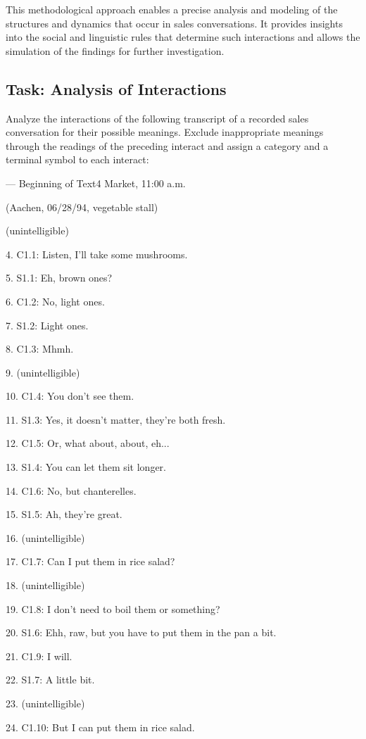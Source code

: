 \documentclass[
]{article}
\begin{document}
This methodological approach enables a precise analysis and modeling of the structures and dynamics that occur in sales conversations. It provides insights into the social and linguistic rules that determine such interactions and allows the simulation of the findings for further investigation.

\subsection{Task: Analysis of Interactions}\label{task-analysis-of-interactions}

Analyze the interactions of the following transcript of a recorded sales conversation for their possible meanings. Exclude inappropriate meanings through the readings of the preceding interact and assign a category and a terminal symbol to each interact:

--- Beginning of Text4 Market, 11:00 a.m.

(Aachen, 06/28/94, vegetable stall)

(unintelligible)

4. C1.1: Listen, I'll take some mushrooms.

5. S1.1: Eh, brown ones?

6. C1.2: No, light ones.

7. S1.2: Light ones.

8. C1.3: Mhmh.

9. (unintelligible)

10. C1.4: You don't see them.

11. S1.3: Yes, it doesn't matter, they're both fresh.

12. C1.5: Or, what about, about, eh...

13. S1.4: You can let them sit longer.

14. C1.6: No, but chanterelles.

15. S1.5: Ah, they're great.

16. (unintelligible)

17. C1.7: Can I put them in rice salad?

18. (unintelligible)

19. C1.8: I don't need to boil them or something?

20. S1.6: Ehh, raw, but you have to put them in the pan a bit.

21. C1.9: I will.

22. S1.7: A little bit.

23. (unintelligible)

24. C1.10: But I can put them in rice salad.
\end{document}
